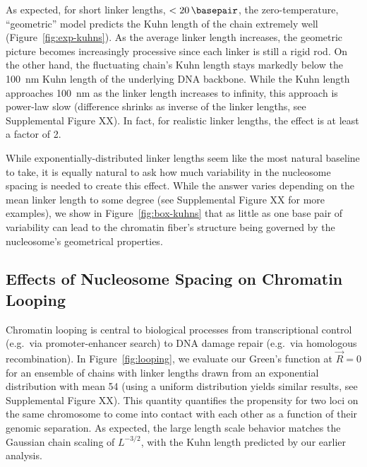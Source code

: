 \documentclass[%
 reprint,
superscriptaddress,
showpacs,preprintnumbers,
 amsmath,amssymb,
 aps,
 prl,
]{revtex4-1}
\begin{document}
As expected, for short linker lengths, $<\SI{20}{\basepair}$, the
    zero-temperature, ``geometric'' model predicts the Kuhn length of the chain
    extremely well (Figure~\ref{fig:exp-kuhns}).
As the average linker length
    increases, the geometric picture becomes increasingly processive since each
    linker is still a rigid rod.
On the other hand, the fluctuating chain's Kuhn length stays markedly below the
    \SI{100}{\nano\metre} Kuhn length of the underlying DNA backbone.
While the Kuhn length approaches \SI{100}{\nano\metre} as the linker length
    increases to infinity, this approach is power-law slow (difference shrinks
    as inverse of the linker lengths, see Supplemental Figure XX).
In fact, for realistic linker lengths, the effect is at least a factor of 2.

While exponentially-distributed linker lengths seem like the most natural
    baseline to take, it is equally natural to ask how much variability in the
    nucleosome spacing is needed to create this effect.
While the answer varies depending on the mean linker length to some degree (see
    Supplemental Figure XX for more examples), we show in
    Figure~\ref{fig:box-kuhns} that as little as one base pair of variability
    can lead to the chromatin fiber's structure being governed by the
    nucleosome's geometrical properties.

\subsection{\label{sec:looping}Effects of Nucleosome Spacing on Chromatin
Looping}

Chromatin looping is central to biological processes from transcriptional
    control (e.g.\ via promoter-enhancer search) to DNA damage repair (e.g.\ via
    homologous recombination).
In Figure~\ref{fig:looping}, we evaluate our Green's function at $\vec{R} = 0$
    for an ensemble of chains with linker lengths drawn from an exponential
    distribution with mean \SI{54}{\basepair} (using a uniform distribution
    yields similar results, see Supplemental Figure XX).
This quantity quantifies the propensity for two loci on the same chromosome to
    come into contact with each other as a function of their genomic separation.
As expected, the large length scale behavior matches the Gaussian chain scaling
    of $L^{-3/2}$, with the Kuhn length predicted by our earlier analysis.
\end{document}

